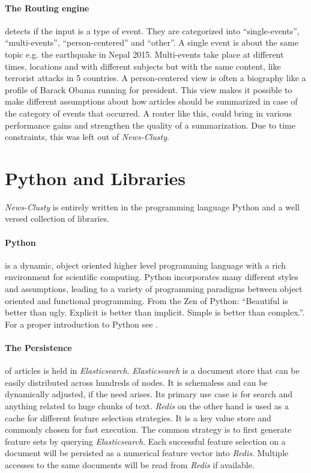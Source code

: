   \paragraph{The Routing engine} detects if the input is a type of event. They are categorized into ``single-events'', ``multi-events'', ``person-centered'' and ``other''. A single event is about the same topic e.g. the earthquake in Nepal 2015. Multi-events take place at different times, locations and with different subjects but with the same content, like terrorist attacks in 5 countries. A person-centered view is often a biography like a profile of Barack Obama running for president. This view makes it possible to make different assumptions about how articles should be summarized in case of the category of events that occurred. A router like this, could bring in various performance gains and strengthen the quality of a summarization. Due to time constraints, this was left out of \emph{News-Clusty}.

\section{Python and Libraries}
\label{sec:python_and_libraries}

  \emph{News-Clusty} is entirely written in the programming language Python and a well versed collection of libraries.

  \paragraph{Python} is a dynamic, object oriented higher level programming language with a rich environment for scientific computing. Python incorporates many different styles and assumptions, leading to a variety of programming paradigms between object oriented and functional programming. From the Zen of Python: ``Beautiful is better than ugly. Explicit is better than implicit. Simple is better than complex.''. For a proper introduction to Python see \cite{NltkPython}.

  \paragraph{The Persistence} of articles is held in \emph{Elasticsearch}. \emph{Elasticsearch} is a document store that can be easily distributed across hundreds of nodes. It is schemaless and can be dynamically adjusted, if the need arises. Its primary use case is for search and anything related to huge chunks of text. \emph{Redis} on the other hand is used as a cache for different feature selection strategies. It is a key value store and commonly chosen for fast execution. The common strategy is to first generate feature sets by querying \emph{Elasticsearch}. Each successful feature selection on a document will be persisted as a numerical feature vector into \emph{Redis}. Multiple accesses to the same documents will be read from \emph{Redis} if available.\\

